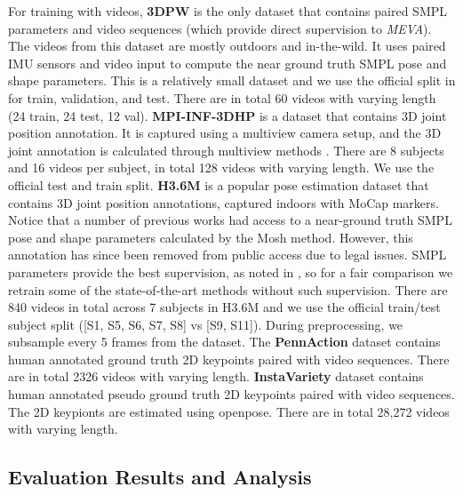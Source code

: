 \documentclass[runningheads]{llncs}
\begin{document}
For training with videos, \textbf{3DPW}  is the only dataset that contains paired SMPL parameters and video sequences (which provide direct supervision to \textit{MEVA}). The videos from this dataset are mostly outdoors and in-the-wild. It uses paired IMU sensors and video input to compute the near ground truth SMPL pose and shape parameters. This is a relatively small dataset and we use the official split in \cite{3dpw} for train, validation, and test. There are in total 60 videos with varying length (24 train, 24 test, 12 val).  \textbf{MPI-INF-3DHP} is a dataset that contains 3D joint position annotation. It is captured using a multiview camera setup, and the 3D joint annotation is calculated through multiview methods \cite{mpi3d}. There are 8 subjects and 16 videos per subject, in total 128 videos with varying length. We use the official test and train split.  \textbf{H3.6M}  is a popular pose estimation dataset that contains 3D joint position annotations, captured indoors with MoCap markers. Notice that a number of previous works \cite{hmr,hmmr,spin,vibe,1908.07172} had access to a near-ground truth SMPL pose and shape parameters calculated by the Mosh \cite{mosh} method. However, this annotation has since been removed from public access due to legal issues. SMPL parameters provide the best supervision, as noted in \cite{examplar}, so for a fair comparison we retrain some of the state-of-the-art methods without such supervision. There are 840 videos in total across 7 subjects in H3.6M and we use the official train/test subject split ([S1, S5, S6, S7, S8] vs [S9, S11]). During preprocessing, we subsample every 5 frames from the dataset. The \textbf{PennAction} dataset contains human annotated ground truth 2D keypoints paired with video sequences. There are in total 2326 videos with varying length. 
\textbf{InstaVariety} dataset contains human annotated pseudo ground truth 2D keypoints paired with video sequences. The 2D keypionts are estimated using openpose\cite{openpose}. There are in total 28,272 videos with varying length. 



\subsection{Evaluation Results and Analysis}
\label{Eval}
\end{document}
